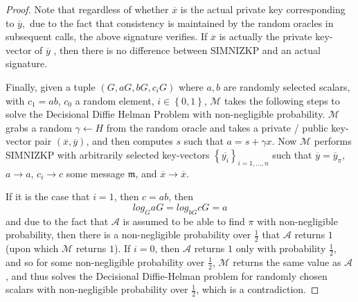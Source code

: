 \documentclass[12pt,oneside,english]{amsart}
\numberwithin{equation}{section}
\numberwithin{figure}{section}
\theoremstyle{plain}
\theoremstyle{plain}
\theoremstyle{remark}
\theoremstyle{plain}
\theoremstyle{remark}
\theoremstyle{remark}
\theoremstyle{plain}
\theoremstyle{definition}
\begin{document}
\begin{proof}
Note that regardless of whether $\overline{x}$ is the actual private
key corresponding to $\overline{y},$ due to the fact that consistency
is maintained by the random oracles in subsequent calls, the above
signature verifies. If $\overline{x}$ is actually the private key-vector
of $\overline{y}$ , then there is no difference between SIMNIZKP
and an actual signature. 

Finally, given a tuple $\left(G,aG,bG,c_{i}G\right)$ where $a,b$
are randomly selected scalars, with $c_{1}=ab$, $c_{0}$ a random
element, $i\in\left\{ 0,1\right\} $, $\mathcal{M}$ takes the following steps to solve the Decisional Diffie
Helman Problem with non-negligible probability. 
$\mathcal{M}$ grabs
a random $\gamma\leftarrow H$ from the random oracle and takes a
private / public key-vector pair $\left(\overline{x},\overline{y}\right)$,
and then computes $s$ such that $a=s+\gamma x$. Now $\mathcal{M}$
performs SIMNIZKP with arbitrarily selected key-vectors $\left\{ \overline{y_{i}}\right\} _{i=1,...,n}$
such that $\overline{y}=\overline{y}_{\pi},$ $a\to a$, $c_{i}\to c$
some message $\mathfrak{m}$, and $\overline{x}\to\overline{x}$. 

If it is the case that $i=1$, then $c=ab$, then 
\[
log_{G}aG=log_{bG}cG=a
\]
 and due to the fact that $\mathcal{A}$ is assumed to be able to
find $\pi$ with non-negligible probability, then there is a non-negligible
probability over $\frac{1}{2}$ that $\mathcal{A}$ returns $1$ (upon
which $\mathcal{M}$ returns $1$). If $i=0$, then $\mathcal{A}$
returns $1$ only with probability $\frac{1}{2}$, and so for some
non-negligible probability over $\frac{1}{2}$, $\mathcal{M}$ returns
the same value as $\mathcal{A}$, and thus solves the Decisional Diffie-Helman problem for randomly chosen scalars with non-negligible probability
over $\frac{1}{2}$, which is a contradiction. 
\end{proof}
\end{document}
